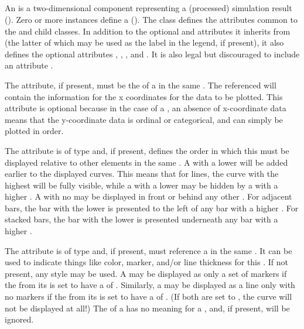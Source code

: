 \begin{blockChanged}
\subsection{}
\label{class:abstractCurve}
An \AbstractCurve is a two-dimensional \Output component representing a (processed) simulation result (). Zero or more \AbstractCurve instances define a \PlotTwo ().  The \AbstractCurve class defines the attributes common to the \Curve and \ShadedArea child classes.  In addition to the optional  and  attributes it inherits from \SedBase (the latter of which may be used as the label in the \Plot legend, if present), it also defines the optional attributes , , , and .  It is also legal but discouraged to include an attribute .


The  attribute, if present, must be the  of a \DataGenerator in the same \SedDocument.  The referenced \DataGenerator will contain the information for the x coordinates for the data to be plotted.  This attribute is optional because in the case of a \Curve, an absence of x-coordinate data means that the y-coordinate data is ordinal or categorical, and can simply be plotted in order.

The  attribute is of type  and, if present, defines the order in which this \Curve must be displayed relative to other \Curve elements in the same \Plot.  A \Curve with a lower  will be added earlier to the displayed curves.  This means that for lines, the curve with the highest  will be fully visible, while a \Curve with a lower  may be hidden by a \Curve with a higher .  A \Curve with no  may be displayed in front or behind any other \Curve.  For adjacent bars, the bar with the lower  is presented to the left of any bar with a higher .  For stacked bars, the bar with the lower  is presented underneath any bar with a higher .

The  attribute is of type  and, if present, must reference a \Style in the same \SedDocument.  It can be used to indicate things like color, marker, and/or line thickness for this \Curve.  If not present, any style may be used.  A \Curve may be displayed as only a set of markers if the \Line from its \Style is set to have a  of .  Similarly, a \Curve may be displayed as a line only with no markers if the \Marker from its \Style is set to have a  of .  (If both are set to , the curve will not be displayed at all!)  The \Fill of a \Style has no meaning for a \Curve, and, if present, will be ignored.


\end{blockChanged}
